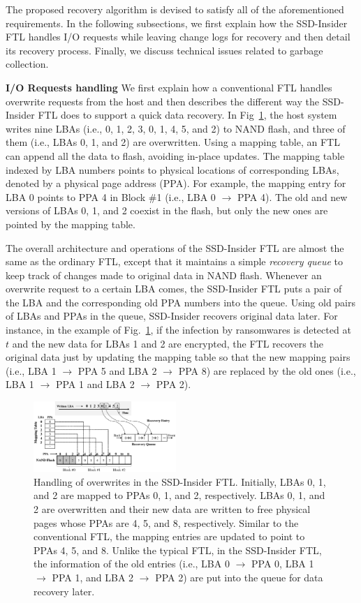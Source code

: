 \documentclass[conference]{IEEEtran}
\newcommand{\ours}{SSD-Insider}
\begin{document}
The proposed recovery algorithm is devised to satisfy all of the
aforementioned requirements.  In the following subsections, we
first explain how the \ours{} FTL handles I/O requests while
leaving change logs for recovery and then detail its recovery
process.  Finally, we discuss technical issues related to garbage
collection.


{\bf I/O Requests handling} 
We first explain how a conventional FTL handles overwrite requests from the
host and then describes the different way the SSD-Insider FTL does to support a
quick data recovery.  In Fig~\ref{fig:io-handling}, the host system writes nine
LBAs (i.e., 0, 1, 2, 3, 0, 1, 4, 5, and 2) to NAND flash, and three of them
(i.e., LBAs 0, 1, and 2) are overwritten.  Using a mapping table, an FTL can
append all the data to flash, avoiding in-place updates. The mapping table
indexed by LBA numbers points to physical locations of corresponding LBAs,
denoted by a physical page address (PPA). For example, the mapping entry for
LBA 0 points to PPA 4 in Block \#1 (i.e., LBA 0 $\rightarrow$ PPA 4).  The old
and new versions of LBAs 0, 1, and 2 coexist in the flash, but only the new
ones are pointed by the mapping table. 

The overall architecture and operations of the \ours{} FTL are almost the same
as the ordinary FTL, except that it maintains a simple \textit{recovery queue}
to keep track of changes made to original data in NAND flash.  Whenever an
overwrite request to a certain LBA comes, the \ours{} FTL puts a pair of the
LBA and the corresponding old PPA numbers into the queue.  Using old pairs of
LBAs and PPAs in the queue, \ours{} recovers original data later.  For
instance, in the example of Fig.~\ref{fig:io-handling}, if the infection by
ransomwares is detected at $t$ and the new data for LBAs 1 and 2 are encrypted,
the FTL recovers the original data just by updating the mapping table so that
the new mapping pairs (i.e., LBA 1 $\rightarrow$ PPA 5 and LBA 2 $\rightarrow$
PPA 8) are replaced by the old ones (i.e., LBA 1 $\rightarrow$ PPA 1 and LBA 2
$\rightarrow$ PPA 2).


\begin{figure}
\centering
\includegraphics[width=0.48\textwidth]{fig/flash-fig2}
\caption{
Handling of overwrites in the \ours{} FTL.  Initially, LBAs 0, 1, and 2 are
mapped to PPAs 0, 1, and 2, respectively.  LBAs 0, 1, and 2 are overwritten and
their new data are written to free physical pages whose PPAs are 4, 5, and 8,
respectively. Similar to the conventional FTL, the mapping entries are updated
to point to PPAs 4, 5, and 8.  Unlike the typical FTL, in the \ours{} FTL, the information
of the old entries (i.e., LBA 0 $\rightarrow$ PPA 0, LBA 1 $\rightarrow$ PPA 1, and LBA 2
$\rightarrow$ PPA 2) are put into the queue for data recovery later.
}
\label{fig:io-handling}
\end{figure}
\end{document}
